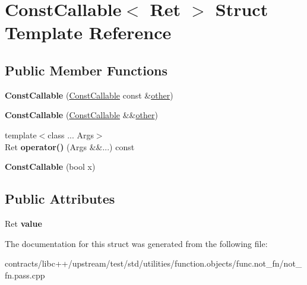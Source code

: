 \hypertarget{struct_const_callable}{}\section{Const\+Callable$<$ Ret $>$ Struct Template Reference}
\label{struct_const_callable}
\subsection*{Public Member Functions}
\begin{DoxyCompactItemize}
\item 
\mbox{\label{struct_const_callable_af9f0fdc2087f09435c8551c4fa01ae73}} 
{\bfseries Const\+Callable} (\mbox{\hyperlink{struct_const_callable}{Const\+Callable}} const \&\mbox{\hyperlink{structother}{other}})
\item 
\mbox{\label{struct_const_callable_a69ab2c6cc0fe36ffafc19e347e9a8b72}} 
{\bfseries Const\+Callable} (\mbox{\hyperlink{struct_const_callable}{Const\+Callable}} \&\&\mbox{\hyperlink{structother}{other}})
\item 
\mbox{\label{struct_const_callable_ab7ef3e69eb6b4666388231e7a915ef6f}} 
{\footnotesize template$<$class ... Args$>$ }\\Ret {\bfseries operator()} (Args \&\&...) const
\item 
\mbox{\label{struct_const_callable_a4dcce8049075fcbe01e64382914680b2}} 
{\bfseries Const\+Callable} (bool x)
\end{DoxyCompactItemize}
\subsection*{Public Attributes}
\begin{DoxyCompactItemize}
\item 
\mbox{\label{struct_const_callable_a5756cbb12ab3d538cbd235c20bea6a9a}} 
Ret {\bfseries value}
\end{DoxyCompactItemize}


The documentation for this struct was generated from the following file\+:\begin{DoxyCompactItemize}
\item 
contracts/libc++/upstream/test/std/utilities/function.\+objects/func.\+not\+\_\+fn/not\+\_\+fn.\+pass.\+cpp\end{DoxyCompactItemize}
